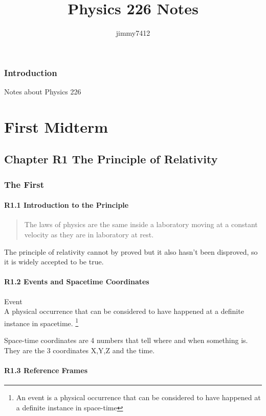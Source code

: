 \documentclass[twocolumn]{report}
\title{Physics 226 Notes}
\author{jimmy7412}
\begin{document}
\maketitle
\tableofcontents{}

\section*{Introduction}
Notes about Physics 226

\part{First Midterm}

\chapter{Chapter R1 The Principle of Relativity}

\section{The First}

\subsection{R1.1 Introduction to the Principle}

\begin{quote}
    The laws of physics are the same inside a laboratory moving at a constant velocity as they are in laboratory at rest. \cite{moore2002six}
\end{quote}

The principle of relativity cannot by proved but it also hasn't been disproved, so it is widely accepted to be true. 

\subsection{R1.2 Events and Spacetime Coordinates}

Event\\
A physical occurrence that can be considered to have happened at a definite instance in spacetime. \footnote{An event is a physical occurrence that can be considered to have happened at a definite instance in space-time}

Space-time coordinates are 4 numbers that tell where and when something is. They are the 3 coordinates X,Y,Z and the time. 

\subsection{R1.3 Reference Frames}
\end{document}
